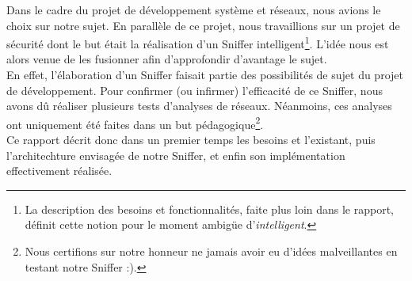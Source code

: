 Dans le cadre du projet de développement système et réseaux, nous avions le choix sur notre sujet. En parallèle de ce projet, nous travaillions sur un projet de sécurité dont le but était la réalisation d'un Sniffer intelligent\footnote{La description des besoins et fonctionnalités, faite  plus loin dans le rapport, définit cette notion pour le moment ambigüe d'\emph{intelligent}.}. L'idée nous est alors venue de les fusionner afin d'approfondir d'avantage le sujet.\\

En effet, l'élaboration d'un Sniffer faisait partie des possibilités de sujet du projet de développement. Pour confirmer (ou infirmer) l'efficacité de ce Sniffer, nous avons dû réaliser plusieurs tests d'analyses de réseaux. Néanmoins, ces analyses ont uniquement été faites dans un but pédagogique\footnote{Nous certifions sur notre honneur ne jamais avoir eu d'idées malveillantes en testant notre Sniffer :).}.\\

 Ce rapport décrit donc dans un premier temps les besoins et l'existant, puis l'architechture envisagée de notre Sniffer, et enfin son implémentation effectivement réalisée.
